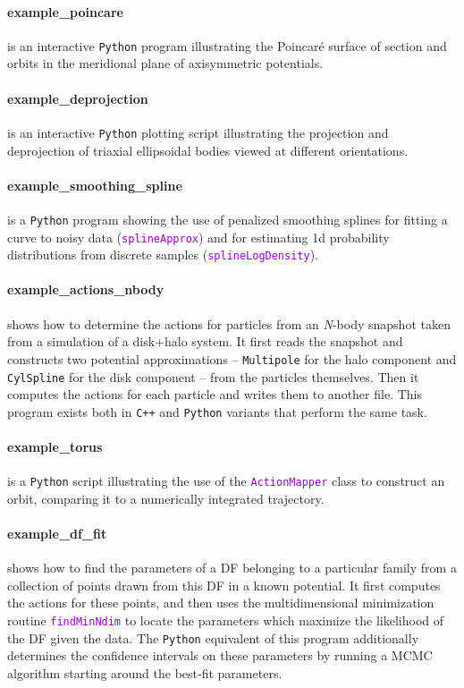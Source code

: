 \documentclass[12pt]{article}
\newcommand{\Nbody}{\textsl{N}-body\xspace}
\newcommand{\Cpp}  {\texttt{C++}\xspace}
\newcommand{\Python}{\texttt{Python}\xspace}
\newcommand{\ttt}[1]{\textcolor{darkviolet}{\texttt{#1}}}
\newcommand{\ppp}[1]{\textcolor{darkolive} {\texttt{#1}}}
\begin{document}
\paragraph{example_poincare} is an interactive \Python program illustrating the Poincar\'e surface of section and orbits in the meridional plane of axisymmetric potentials.

\paragraph{example_deprojection} is an interactive \Python plotting script illustrating the projection and deprojection of triaxial ellipsoidal bodies viewed at different orientations.

\paragraph{example_smoothing_spline} is a \Python program showing the use of penalized smoothing splines for fitting a curve to noisy data (\ttt{splineApprox}) and for estimating 1d probability distributions from discrete samples (\ttt{splineLogDensity}).

\paragraph{example_actions_nbody} shows how to determine the actions for particles from an \Nbody snapshot taken from a simulation of a disk+halo system. It first reads the snapshot and constructs two potential approximations -- \ppp{Multipole} for the halo component and \ppp{CylSpline} for the disk component -- from the particles themselves. Then it computes the actions for each particle and writes them to another file. This program exists both in \Cpp and \Python variants that perform the same task.

\paragraph{example_torus} is a \Python script illustrating the use of the \ttt{ActionMapper} class to construct an orbit, comparing it to a numerically integrated trajectory.

\paragraph{example_df_fit} shows how to find the parameters of a DF belonging to a particular family from a collection of points drawn from this DF in a known potential. It first computes the actions for these points, and then uses the multidimensional minimization routine \ttt{findMinNdim} to locate the parameters which maximize the likelihood of the DF given the data.
The \Python equivalent of this program additionally determines the confidence intervals on these parameters by running a MCMC algorithm starting around the best-fit parameters.
\end{document}
